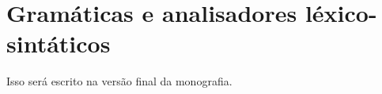 
  \section{Gramáticas e analisadores léxico-sintáticos}
  \label{cap:conceitos:gramaticas}

    Isso será escrito na versão final da monografia.

